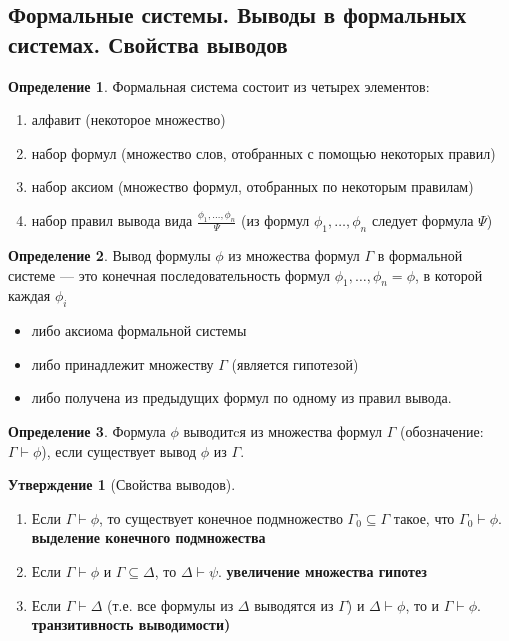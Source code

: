 \documentclass[a4paper]{article}
\theoremstyle{definition}
\newtheorem*{definition}{Определение}
\newtheorem*{statement}{Утверждение}
\theoremstyle{remark}
\begin{document}
    \subsection{Формальные системы. Выводы в формальных системах. Свойства выводов}
    \begin{definition}
        Формальная система состоит из четырех элементов:
        \begin{enumerate}
            \item алфавит (некоторое множество)
            \item набор формул (множество слов, отобранных с помощью некоторых правил)
            \item набор аксиом (множество формул, отобранных по некоторым правилам)
            \item набор правил вывода вида $\frac{\phi_1, \dots, \phi_n}{\Psi}$
            (из формул $\phi_1, \dots, \phi_n$ следует формула $\Psi$)
        \end{enumerate}
    \end{definition}
    \begin{definition}
        Вывод формулы $\phi$ из множества формул $\Gamma$ в формальной системе — это конечная 
        последовательность формул $\phi_1, \dots , \phi_n = \phi$, в которой каждая $\phi_i$
        \begin{itemize}
            \item либо аксиома формальной системы
            \item либо принадлежит множеству $\Gamma$ (является гипотезой)
            \item либо получена из предыдущих формул по одному из правил вывода.
        \end{itemize}
    \end{definition}
    \begin{definition}
        Формула $\phi$ выводитcя из множества формул $\Gamma$ (обозначение:$ \Gamma \vdash \phi$), если существует 
вывод $\phi$ из $\Gamma$.
    \end{definition}
    \begin{statement}[Свойства выводов]
        $ $\\
        \begin{enumerate}
            \item Если $\Gamma \vdash \phi$, то существует конечное подмножество $\Gamma_0 \subseteq \Gamma$ такое, что $\Gamma_0 \vdash \phi$.
            \textbf{выделение конечного подмножества}
            \item Если $\Gamma \vdash \phi$ и $\Gamma \subseteq \Delta$, то $\Delta\vdash \psi $.
            \textbf{увеличение множества гипотез}
            \item  Если $\Gamma \vdash \Delta$ (т.е. все формулы из $\Delta$ выводятся из $\Gamma$) и 
            $\Delta \vdash \phi$, то и $\Gamma \vdash \phi$.
            \textbf{транзитивность выводимости)}
        \end{enumerate}
    \end{statement}
\end{document}
